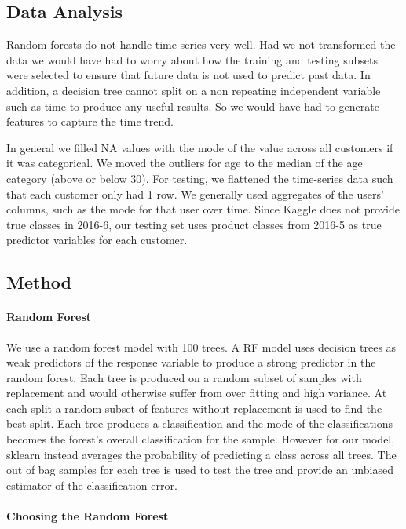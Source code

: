 \documentclass{article}
\begin{document}
\begin{spacing}{1}
\begin{large}
\subsection{Data Analysis}

Random forests do not handle time series very well. Had we not transformed the data we would have had to worry about how the training and testing subsets were selected to ensure that future data is not used to predict past data. In addition, a decision tree cannot split on a non repeating independent variable such as time to produce any useful results. So we would have had to generate features to capture the time trend.

In general we filled NA values with the mode of the value across all customers if it was categorical. We moved the outliers for age to the median of the age category (above or below 30).
For testing, we flattened the time-series data such that each customer only had 1 row. We generally used aggregates of the users' columns, such as the mode for that user over time.
Since Kaggle does not provide true classes in 2016-6, our testing set uses product classes from 2016-5 as true predictor variables for each customer.

\subsection{Method}

\paragraph{Random Forest}
We use a random forest model with 100 trees. A RF model uses decision trees as weak predictors of the response variable to produce a strong predictor in the random forest. Each tree is produced on a random subset of samples with replacement and would otherwise suffer from over fitting and high variance. At each split a random subset of features without replacement is used to find the best split. Each tree produces a classification and the mode of the classifications becomes the forest's overall classification for the sample. However for our model, sklearn instead averages the probability of predicting a class across all trees.\cite{rnSKlearn}  The out of bag samples for each tree is used to test the tree and provide an unbiased estimator of the classification error.\cite{rnLeo}

\paragraph{Choosing the Random Forest}


\end{large}
\end{spacing}
\end{document}
